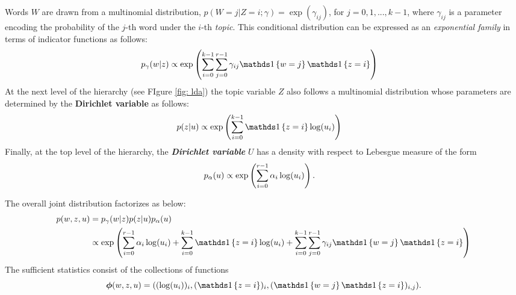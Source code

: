 \documentclass[11pt]{article}
\begin{document}
Words $W$ are drawn from a multinomial distribution, $p(W = j |Z = i; \gamma) = \exp(\gamma_{ij})$, for $j = 0,1,...,k − 1$, where $\gamma_{ij}$ is a parameter encoding the probability of the $j$-th word under the $i$-th \emph{topic}. This conditional distribution can be expressed as an \emph{exponential family} in terms of indicator functions as follows:
\begin{align}
p_{\gamma}(w|z) &\propto \exp\paren{\sum_{i=0}^{k-1}\sum_{j=0}^{r-1}\gamma_{ij}\ind{w=j}\ind{z=i}} \label{eqn: lda_words_per_topic}
\end{align} At the next level of the hierarchy (see FIgure \ref{fig: lda}) the topic variable $Z$ also follows a multinomial distribution whose parameters are determined by the \textbf{Dirichlet variable} as follows:
\begin{align}
p(z|u) &\propto \exp\paren{\sum_{i=0}^{k-1}\ind{z=i}\log(u_i)} \label{eqn: lda_topics_per_documents}
\end{align}
Finally, at the top level of the hierarchy, the \emph{\textbf{Dirichlet variable}} $U$ has a density with respect to Lebesgue measure of the
form 
\begin{align}
p_{\alpha}(u) &\propto \exp\left( \sum_{i=0}^{r-1}\alpha_{i} \log(u_i)\right).
\end{align}

The overall joint distribution factorizes as below:
\begin{align}
p(w, z, u) &= p_{\gamma}(w|z) p(z|u) p_{\alpha}(u)  \nonumber\\
&\propto \exp\paren{ \sum_{i=0}^{r-1}\alpha_{i} \log(u_i) + \sum_{i=0}^{k-1}\ind{z=i}\log(u_i) + \sum_{i=0}^{k-1}\sum_{j=0}^{r-1}\gamma_{ij}\ind{w=j}\ind{z=i}} \label{eqn: lda}
\end{align} The sufficient statistics  consist of the collections of functions $$\mb{\phi}(w,z,u)= ((\log(u_i))_i, (\ind{z=i})_i, (\ind{w=j}\ind{z=i})_{i,j}).$$
\end{document}
